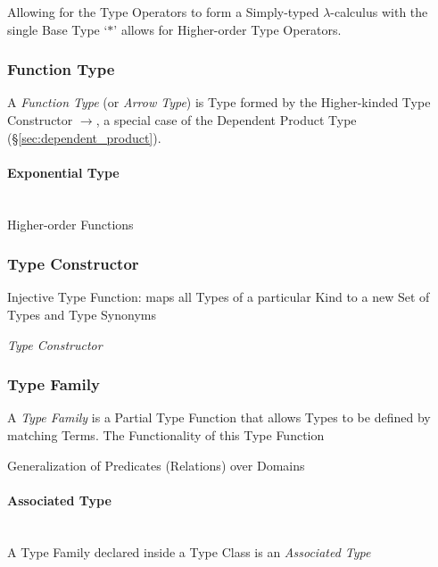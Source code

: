Allowing for the Type Operators to form a Simply-typed
$\lambda$-calculus with the single Base Type `$*$' allows for
Higher-order Type Operators.



\subsubsection{Function Type}\label{sec:function_type}

A \emph{Function Type} (or \emph{Arrow Type}) is Type formed by the
Higher-kinded Type Constructor $\rightarrow$, a special case of the
Dependent Product Type (\S\ref{sec:dependent_product}).



\paragraph{Exponential Type}\label{sec:exponential_type}
\hfill \\

Higher-order Functions



\subsubsection{Type Constructor}\label{sec:type_constructor}

Injective Type Function: maps all Types of a particular Kind to a new
Set of Types and Type Synonyms

\emph{Type Constructor}



\subsubsection{Type Family}\label{sec:type_family}

A \emph{Type Family} is a Partial Type Function that allows Types to
be defined by matching Terms. The Functionality of this Type Function

Generalization of Predicates (Relations) over Domains



\paragraph{Associated Type}\label{sec:associated_type}
\hfill \\

A Type Family declared inside a Type Class is an \emph{Associated
  Type}



